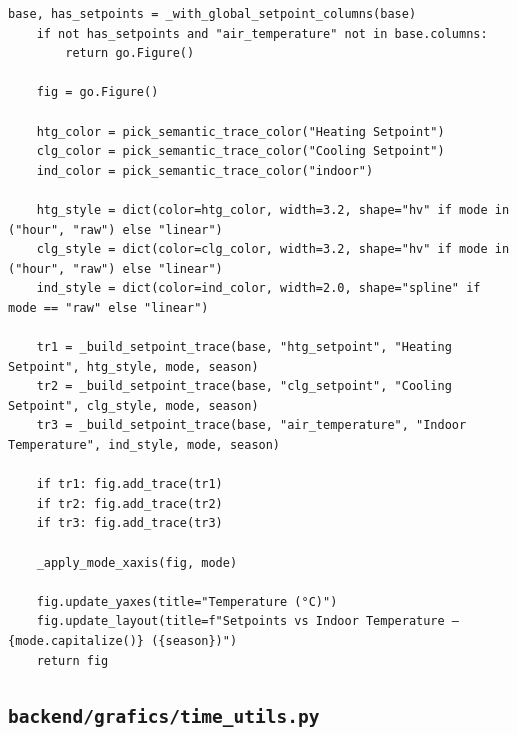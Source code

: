 \documentclass[10pt,a4paper]{article}
\begin{document}
\begin{lstlisting}[style=studioPython,caption={backend/grafics/thermal.py},label={lst:backend-grafics-thermal-py}]
    base, has_setpoints = _with_global_setpoint_columns(base)
    if not has_setpoints and "air_temperature" not in base.columns:
        return go.Figure()

    fig = go.Figure()

    htg_color = pick_semantic_trace_color("Heating Setpoint")
    clg_color = pick_semantic_trace_color("Cooling Setpoint")
    ind_color = pick_semantic_trace_color("indoor")

    htg_style = dict(color=htg_color, width=3.2, shape="hv" if mode in ("hour", "raw") else "linear")
    clg_style = dict(color=clg_color, width=3.2, shape="hv" if mode in ("hour", "raw") else "linear")
    ind_style = dict(color=ind_color, width=2.0, shape="spline" if mode == "raw" else "linear")

    tr1 = _build_setpoint_trace(base, "htg_setpoint", "Heating Setpoint", htg_style, mode, season)
    tr2 = _build_setpoint_trace(base, "clg_setpoint", "Cooling Setpoint", clg_style, mode, season)
    tr3 = _build_setpoint_trace(base, "air_temperature", "Indoor Temperature", ind_style, mode, season)

    if tr1: fig.add_trace(tr1)
    if tr2: fig.add_trace(tr2)
    if tr3: fig.add_trace(tr3)

    _apply_mode_xaxis(fig, mode)

    fig.update_yaxes(title="Temperature (°C)")
    fig.update_layout(title=f"Setpoints vs Indoor Temperature – {mode.capitalize()} ({season})")
    return fig
\end{lstlisting}


\subsection{\texorpdfstring{\texttt{backend/grafics/time\_utils.py}}{backend/grafics/time\_utils.py}}
\end{document}
